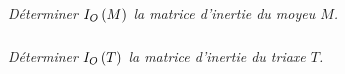 \documentclass[10pt,fleqn]{article} %
\begin{document}
\begin{multicols}{2}
\begin{corrige}
%
%
%
% 
 
\end{corrige}
\else
\fi

\subparagraph{}
\textit{Déterminer $I_{O}\left( M\right)$  la matrice d'inertie du moyeu $M$.}
\ifprof
\begin{corrige}
 
\end{corrige}
\else
\fi


\subparagraph{}
\textit{Déterminer $I_{O}\left( T\right)$  la matrice d'inertie du triaxe $T$.}
\ifprof
\begin{corrige}
 
\end{corrige}
\else
\fi
%
%
%


\end{multicols}
\end{document}
